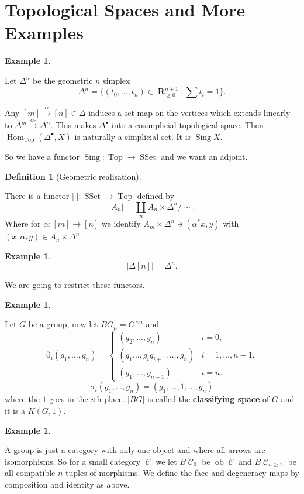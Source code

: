 \documentclass[10pt,]{book}
\newcommand{\terminology}[1]{\textbf{#1}}
\theoremstyle{plain}
\theoremstyle{definition}
\newtheorem{definition}[theorem]{Definition}
\newtheorem{example}[theorem]{Example}
\numberwithin{equation}{section}
\DeclareMathOperator{\Hom}{Hom}
\DeclareMathOperator{\ob}{ob}
\DeclareMathOperator{\Sing}{Sing}
\DeclareMathOperator{\Top}{\text{Top}}
\DeclareMathOperator{\SSet}{\text{SSet}}
\DeclareMathOperator{\cC}{\mathcal{C}}
\DeclareMathOperator{\dd}{\partial}
\DeclareMathOperator{\RR}{\mathbf{R}}
\begin{document}
\section[Topological Spaces and More Examples]{Topological Spaces and More Examples}\label{sec-top-examples}
\begin{example}\label{example-19}

            Let \(\Delta^n\) be the geometric \(n\) simplex
            \[\Delta^n = \{(t_0,\ldots,t_n) \in \RR_{\ge 0}^{n+1} : \sum t_i = 1\}.\]

            Any \([m]\xrightarrow{\alpha} [n] \in \Delta\) induces a set map on the vertices which extends linearly to \(\Delta^m \xrightarrow{\alpha_*} \Delta^n\).
            This makes \(\Delta^{\bullet}\) into a cosimplicial topological space.
            Then \(\Hom_{\Top}(\Delta^{\bullet}, X)\) is naturally a simplicial set.
            It is \(\Sing X\).

            So we have a functor \(\Sing \colon \Top \to \SSet\) and we want an adjoint.
          \end{example}
\begin{definition}[Geometric realisation]\label{definition-28}

            There is a functor \(|\cdot |\colon \SSet \to \Top\) defined by
            \[
              |A_n| = \coprod_n A_n \times \Delta^n / \sim.
            \]
            Where for \(\alpha \colon [m] \to [n]\) we identify \(A_m \times \Delta^n \ni (\alpha^* x, y)\) with \((x, \alpha_* y) \in A_n \times \Delta^n\).
          \end{definition}
\begin{example}\label{example-20}
\[|\Delta[n]| = \Delta^n.\]\end{example}

          We are going to restrict these functors.
\begin{example}\label{example-21}

            Let \(G\) be a group, now let \(BG_n = G^{\times n}\) and
            \[\dd_i(g_1,\ldots,g_n) = \begin{cases}(g_2,\ldots,g_n) & i = 0, \\(g_1\ldots,g_ig_{i+1},\ldots,g_n) & i = 1,\ldots,n-1,\\(g_1,\ldots,g_{n-1}) & i = n.\end{cases}\]\[\sigma_i(g_1,\ldots,g_n) = (g_1,\ldots,1,\ldots,g_n)\]
            where the \(1\) goes in the \(i\)th place.
            \(|BG|\) is called the \terminology{classifying space} of \(G\) and it is a \(K(G,1)\).
          \end{example}
\begin{example}\label{example-22}

            A group is just a category with only one object and where all arrows are isomorphisms.
            So for a small category \(\cC\) we let \(B\cC_0\) be \(\ob \cC\) and \(B\cC_{n\ge 1}\) be all compatible \(n\)-tuples of morphisms.
            We define the face and degeneracy maps by composition and identity as above.
          \end{example}
\typeout{************************************************}
\typeout{************************************************}
\end{document}
